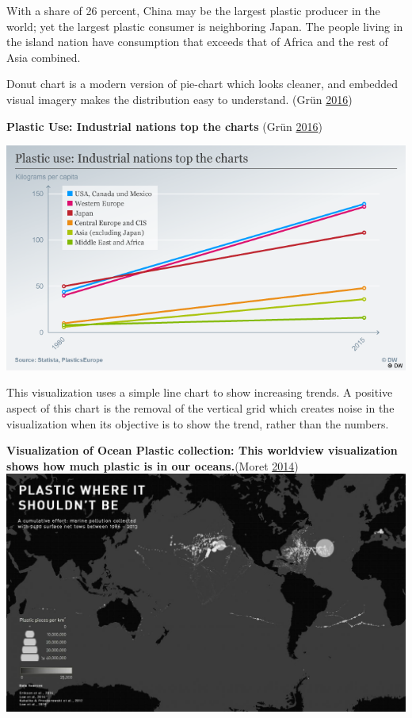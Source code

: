 \documentclass[]{book}
\begin{document}
With a share of 26 percent, China may be the largest plastic producer in the world; yet the largest plastic consumer is neighboring Japan. The people living in the island nation have consumption that exceeds that of Africa and the rest of Asia combined.

Donut chart is a modern version of pie-chart which looks cleaner, and embedded visual imagery makes the distribution easy to understand.
(Grün \protect\hyperlink{ref-plastic_pollution_visualizations}{2016})

\textbf{Plastic Use: Industrial nations top the charts} (Grün \protect\hyperlink{ref-plastic_pollution_visualizations}{2016})

\includegraphics{images/plastic_use.png}

This visualization uses a simple line chart to show increasing trends. A positive aspect of this chart is the removal of the vertical grid which creates noise in the visualization when its objective is to show the trend, rather than the numbers.

\textbf{Visualization of Ocean Plastic collection: This worldview visualization shows how much plastic is in our oceans.}(Moret \protect\hyperlink{ref-ocean_plastic_pollution}{2014})
\includegraphics{images/Ocean_Plasticpollution.jpg}
\end{document}
